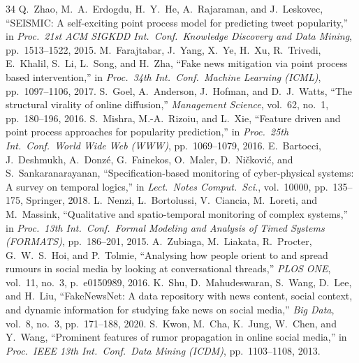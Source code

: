 \documentclass[10pt,twocolumn,a4paper]{article}
\begin{document}
{\begin{thebibliography}{34}
 Q.~Zhao, M.~A.~Erdogdu, H.~Y.~He, A.~Rajaraman, and J.~Leskovec, ``SEISMIC: A self-exciting point process model for predicting tweet popularity,'' in \emph{Proc.\ 21st ACM SIGKDD Int.\ Conf.\ Knowledge Discovery and Data Mining}, pp.~1513--1522, 2015.
 M.~Farajtabar, J.~Yang, X.~Ye, H.~Xu, R.~Trivedi, E.~Khalil, S.~Li, L.~Song, and H.~Zha, ``Fake news mitigation via point process based intervention,'' in \emph{Proc.\ 34th Int.\ Conf.\ Machine Learning (ICML)}, pp.~1097--1106, 2017.
 S.~Goel, A.~Anderson, J.~Hofman, and D.~J.~Watts, ``The structural virality of online diffusion,'' \emph{Management Science}, vol.~62, no.~1, pp.~180--196, 2016.
 S.~Mishra, M.-A.~Rizoiu, and L.~Xie, ``Feature driven and point process approaches for popularity prediction,'' in \emph{Proc.\ 25th Int.\ Conf.\ World Wide Web (WWW)}, pp.~1069--1079, 2016.
 E.~Bartocci, J.~Deshmukh, A.~Donz{\'e}, G.~Fainekos, O.~Maler, D.~Ni{\v{c}}kovi{\'c}, and S.~Sankaranarayanan, ``Specification-based monitoring of cyber-physical systems: A survey on temporal logics,'' in \emph{Lect.\ Notes Comput.\ Sci.}, vol.~10000, pp.~135--175, Springer, 2018.
 L.~Nenzi, L.~Bortolussi, V.~Ciancia, M.~Loreti, and M.~Massink, ``Qualitative and spatio-temporal monitoring of complex systems,'' in \emph{Proc.\ 13th Int.\ Conf.\ Formal Modeling and Analysis of Timed Systems (FORMATS)}, pp.~186--201, 2015.
 A.~Zubiaga, M.~Liakata, R.~Procter, G.~W.~S.~Hoi, and P.~Tolmie, ``Analysing how people orient to and spread rumours in social media by looking at conversational threads,'' \emph{PLOS ONE}, vol.~11, no.~3, p.~e0150989, 2016.
 K.~Shu, D.~Mahudeswaran, S.~Wang, D.~Lee, and H.~Liu, ``FakeNewsNet: A data repository with news content, social context, and dynamic information for studying fake news on social media,'' \emph{Big Data}, vol.~8, no.~3, pp.~171--188, 2020.
 S.~Kwon, M.~Cha, K.~Jung, W.~Chen, and Y.~Wang, ``Prominent features of rumor propagation in online social media,'' in \emph{Proc.\ IEEE 13th Int.\ Conf.\ Data Mining (ICDM)}, pp.~1103--1108, 2013.
\end{thebibliography}}
\end{document}
